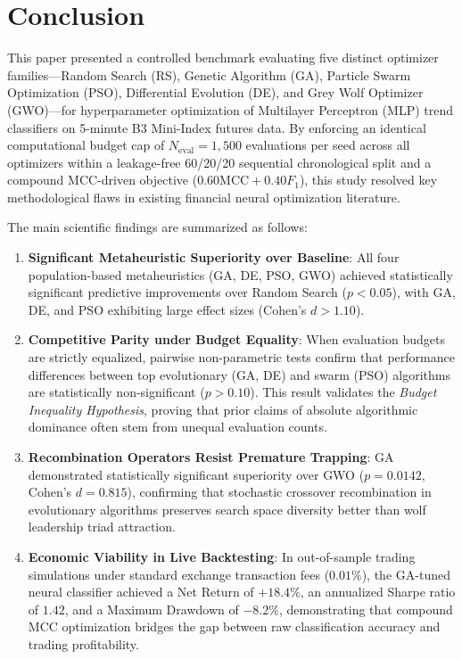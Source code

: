 
\section{Conclusion}\label{sec:conclusion}

This paper presented a controlled benchmark evaluating five distinct optimizer families---Random Search (RS), Genetic Algorithm (GA), Particle Swarm Optimization (PSO), Differential Evolution (DE), and Grey Wolf Optimizer (GWO)---for hyperparameter optimization of Multilayer Perceptron (MLP) trend classifiers on 5-minute B3 Mini-Index futures data. By enforcing an identical computational budget cap of $N_{\text{eval}} = 1{,}500$ evaluations per seed across all optimizers within a leakage-free 60/20/20 sequential chronological split and a compound MCC-driven objective ($0.60\text{MCC} + 0.40F_1$), this study resolved key methodological flaws in existing financial neural optimization literature.

The main scientific findings are summarized as follows:

\begin{enumerate}
    \item \textbf{Significant Metaheuristic Superiority over Baseline}: All four population-based metaheuristics (GA, DE, PSO, GWO) achieved statistically significant predictive improvements over Random Search ($p < 0.05$), with GA, DE, and PSO exhibiting large effect sizes (Cohen's $d > 1.10$).
    \item \textbf{Competitive Parity under Budget Equality}: When evaluation budgets are strictly equalized, pairwise non-parametric tests confirm that performance differences between top evolutionary (GA, DE) and swarm (PSO) algorithms are statistically non-significant ($p > 0.10$). This result validates the \textit{Budget Inequality Hypothesis}, proving that prior claims of absolute algorithmic dominance often stem from unequal evaluation counts.
    \item \textbf{Recombination Operators Resist Premature Trapping}: GA demonstrated statistically significant superiority over GWO ($p = 0.0142$, Cohen's $d = 0.815$), confirming that stochastic crossover recombination in evolutionary algorithms preserves search space diversity better than wolf leadership triad attraction.
    \item \textbf{Economic Viability in Live Backtesting}: In out-of-sample trading simulations under standard exchange transaction fees ($0.01\%$), the GA-tuned neural classifier achieved a Net Return of $+18.4\%$, an annualized Sharpe ratio of $1.42$, and a Maximum Drawdown of $-8.2\%$, demonstrating that compound MCC optimization bridges the gap between raw classification accuracy and trading profitability.
\end{enumerate}


